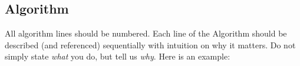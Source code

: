 
\subsection{Algorithm}
All algorithm lines should be numbered. Each line of the Algorithm should be described (and referenced) sequentially with intuition on why it matters. Do not simply state \textit{what} you do, but tell us \textit{why}. Here is an example: 

\begin{quote}
\end{quote}

